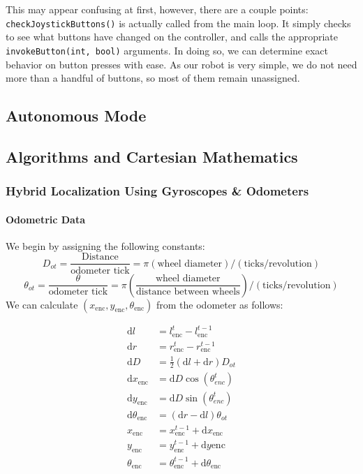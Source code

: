 \documentclass{article}
\begin{document}
This may appear confusing at first, however, there are a couple points: \lstinline{checkJoystickButtons()}{} is actually called from the main loop. It simply checks to see what buttons have changed on the controller, and calls the appropriate \lstinline{invokeButton(int, bool)}{} arguments. In doing so, we can determine exact behavior on button presses with ease. As our robot is very simple, we do not need more than a handful of buttons, so most of them remain unassigned.

\newpage \subsection{Autonomous Mode}

\newpage \subsection{Algorithms and Cartesian Mathematics}

\subsubsection{Hybrid Localization Using Gyroscopes \& Odometers}
\paragraph{Odometric Data}
We begin by assigning the following constants: 
\[D_{ot}=\frac{\text{Distance}}{\text{odometer tick}}=\pi(\text{wheel diameter})/(\text{ticks/revolution})\]\[ \theta_{ot} = \frac{\theta}{\text{odometer tick}} = \pi\left(\frac{\text{wheel diameter}}{\text{distance between wheels}}\right)/(\text{ticks/revolution})\]
We can calculate $(x_{\mathrm{enc}}, y_{\mathrm{enc}}, \theta_{\mathrm{enc}})$ from the odometer as follows: 
\begin{center}
	\begin{align*}
		\mathrm{d}l &= l^t_{\mathrm{enc}}-l^{t-1}_{\mathrm{enc}} \\
		\mathrm{d}r &= r^t_{\mathrm{enc}}-r^{t-1}_{\mathrm{enc}} \\
		\mathrm{d}D &= \frac{1}{2}(\mathrm{d}l+\mathrm{d}r)D_{ot} \\
		\mathrm{d}x_{\mathrm{enc}} &= \mathrm{d}D\cos(\theta^t_{enc}) \\
		\mathrm{d}y_{\mathrm{enc}} &= \mathrm{d}D\sin(\theta^t_{enc}) \\
		\mathrm{d}\theta_{\mathrm{enc}} &= (\mathrm{d}r-\mathrm{d}l)\theta_{ot} \\
		x_{\mathrm{enc}} &= x^{t-1}_{\mathrm{enc}} + \mathrm{d}x_{\mathrm{enc}} \\
		y_{\mathrm{enc}} &= y^{t-1}_{\mathrm{enc}} + \mathrm{d}y{\mathrm{enc}} \\
		\theta_{\mathrm{enc}} &= \theta^{t-1}_{\mathrm{enc}} + \mathrm{d}\theta_{\mathrm{enc}}
	\end{align*}
\end{center}
\end{document}
